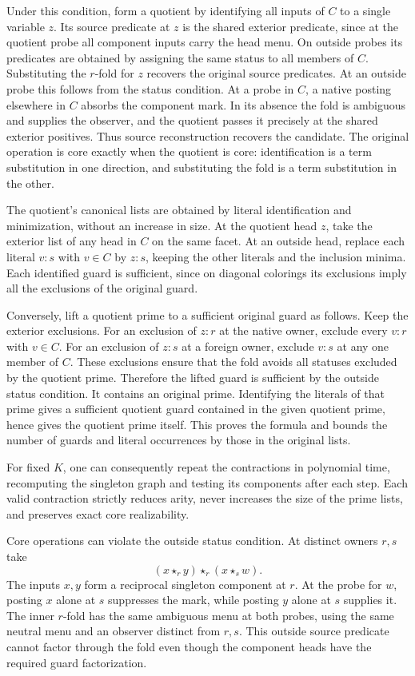 Under this condition, form a quotient by identifying
all inputs of $C$ to a single variable $z$. Its source
predicate at $z$ is the shared exterior predicate,
since at the quotient probe all component inputs
carry the head menu. On outside probes its predicates
are obtained by assigning the same status to all
members of $C$. Substituting the $r$-fold for $z$
recovers the original source predicates. At an outside
probe this follows from the status condition. At a
probe in $C$, a native posting elsewhere in $C$
absorbs the component mark. In its absence the fold
is ambiguous and supplies the observer, and the
quotient passes it precisely at the shared exterior
positives. Thus source reconstruction recovers the
candidate. The original operation is core exactly
when the quotient is core: identification is a term
substitution in one direction, and substituting the
fold is a term substitution in the other.

The quotient's canonical lists are obtained by literal
identification and minimization, without an increase in
size. At the quotient head $z$, take the exterior
list of any head in $C$ on the same facet. At an outside
head, replace each literal $v{:}s$ with $v\in C$ by
$z{:}s$, keeping the other literals and the inclusion
minima. Each identified guard is sufficient, since on
diagonal colorings its exclusions imply all the
exclusions of the original guard.

Conversely, lift a quotient prime to a sufficient
original guard as follows. Keep the exterior
exclusions. For an exclusion of $z{:}r$ at the native
owner, exclude every $v{:}r$ with $v\in C$. For an
exclusion of $z{:}s$ at a foreign owner, exclude
$v{:}s$ at any one member of $C$. These exclusions
ensure that the fold avoids all statuses excluded by
the quotient prime. Therefore the lifted guard is
sufficient by the outside status condition. It contains
an original prime. Identifying the literals of that
prime gives a sufficient quotient guard contained in
the given quotient prime, hence gives the quotient
prime itself. This proves the formula and bounds the
number of guards and literal occurrences by those in
the original lists.

For fixed $K$, one can consequently repeat the
contractions in polynomial time, recomputing the
singleton graph and testing its components after each
step. Each valid contraction strictly reduces arity,
never increases the size of the prime lists, and
preserves exact core realizability.

Core operations can violate the outside status
condition. At distinct owners $r,s$ take
\[
   (x\star_r y)\star_r(x\star_s w).
\]
The inputs $x,y$ form a reciprocal singleton
component at $r$. At the probe for $w$, posting
$x$ alone at $s$ suppresses the mark, while posting
$y$ alone at $s$ supplies it. The inner $r$-fold
has the same ambiguous menu at both probes, using
the same neutral menu and an observer distinct
from $r,s$. This outside source predicate cannot
factor through the fold even though the component
heads have the required guard factorization.

